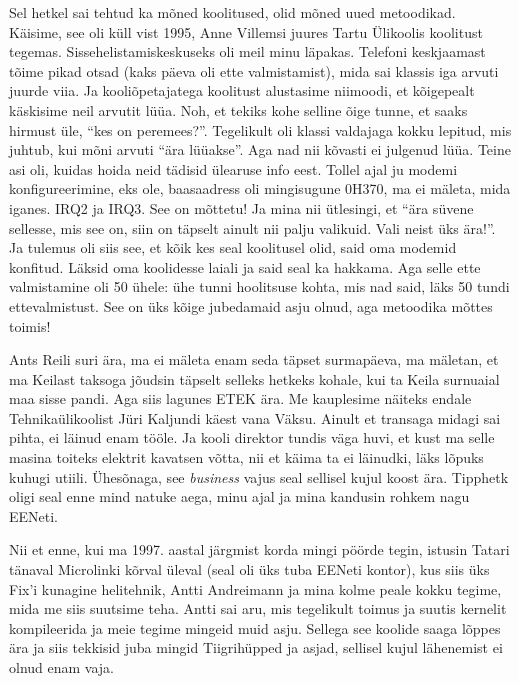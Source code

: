 Sel hetkel sai tehtud ka mõned koolitused,  olid mõned uued metoodikad. Käisime, see oli küll vist 1995, Anne Villemsi juures Tartu Ülikoolis koolitust tegemas. Sissehelistamiskeskuseks oli meil minu läpakas. Telefoni keskjaamast tõime pikad otsad (kaks päeva oli ette valmistamist), mida sai klassis iga arvuti juurde viia. Ja  kooliõpetajatega koolitust alustasime niimoodi, et kõigepealt käskisime neil arvutit lüüa.  Noh, et tekiks kohe selline õige tunne, et saaks hirmust üle, \enquote{kes on peremees?}. Tegelikult oli klassi valdajaga kokku lepitud, mis juhtub, kui mõni arvuti \enquote{ära lüüakse}. Aga nad nii kõvasti ei julgenud lüüa. Teine asi oli, kuidas hoida neid tädisid ülearuse info eest. Tollel ajal ju modemi konfigureerimine, eks ole, baasaadress oli mingisugune 0H370, ma ei mäleta, mida iganes. IRQ2 ja IRQ3. See on mõttetu! Ja mina nii ütlesingi, et \enquote{ära süvene sellesse, mis see on, siin on täpselt ainult nii palju valikuid. Vali neist üks ära!}. Ja tulemus oli siis see, et kõik kes seal koolitusel olid, said oma modemid konfitud. Läksid oma koolidesse laiali ja said seal ka hakkama. Aga selle ette valmistamine oli 50 ühele: ühe tunni hoolitsuse kohta, mis nad said, läks 50 tundi ettevalmistust. See on üks kõige jubedamaid asju olnud, aga metoodika mõttes toimis! 

Ants Reili suri ära, ma ei mäleta enam seda täpset surmapäeva, ma mäletan, et ma Keilast taksoga jõudsin täpselt selleks hetkeks kohale, kui ta Keila surnuaial maa sisse pandi. Aga siis lagunes ETEK ära. Me kauplesime näiteks endale Tehnikaülikoolist Jüri Kaljundi käest vana Väksu. Ainult et transaga midagi sai pihta, ei läinud enam tööle. Ja kooli direktor tundis väga huvi, et kust ma selle masina toiteks elektrit kavatsen võtta, nii et käima ta ei läinudki, läks lõpuks kuhugi utiili. Ühesõnaga, see \emph{business} vajus seal sellisel kujul koost ära. Tipphetk oligi seal enne mind natuke aega, minu ajal ja mina kandusin rohkem nagu EENeti. 

Nii et enne, kui ma 1997. aastal järgmist korda mingi pöörde tegin, istusin  Tatari tänaval Microlinki kõrval üleval (seal oli üks tuba EENeti kontor), kus siis üks Fix'i kunagine helitehnik, Antti Andreimann ja  mina  kolme peale kokku tegime, mida me siis suutsime teha. Antti sai aru, mis tegelikult toimus ja suutis kernelit kompileerida ja meie tegime mingeid muid asju. Sellega see koolide saaga lõppes ära ja siis tekkisid juba mingid Tiigrihüpped ja asjad, sellisel kujul lähenemist ei olnud enam vaja. 

